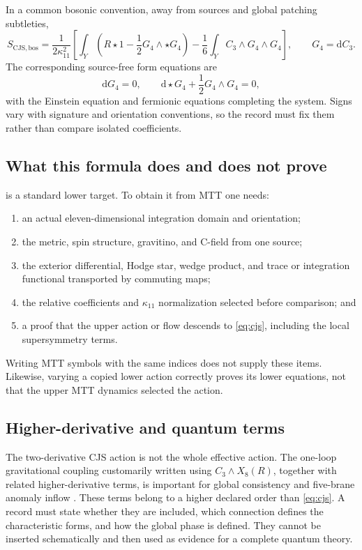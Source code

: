 \documentclass[11pt]{article}
\theoremstyle{definition}
\theoremstyle{remark}
\newcommand{\dd}{\mathrm d}
\begin{document}
In a common bosonic convention, away from sources and global patching
subtleties,
\begin{equation}
S_{\mathrm{CJS,bos}}
=\frac{1}{2\kappa_{11}^{2}}
\left[
\int_Y\left(R\star 1-\frac12 G_4\wedge\star G_4\right)
-\frac16\int_Y C_3\wedge G_4\wedge G_4
\right],
\qquad
G_4=\dd C_3 .
\label{eq:cjs}
\end{equation}
The corresponding source-free form equations are
\begin{equation}
\dd G_4=0,
\qquad
\dd\star G_4+\frac12 G_4\wedge G_4=0,
\label{eq:form-eom}
\end{equation}
with the Einstein equation and fermionic equations completing the system.
Signs vary with signature and orientation conventions, so the record must
fix them rather than compare isolated coefficients.

\subsection{What this formula does and does not prove}

 is a standard lower target.  To obtain it from MTT one needs:
\begin{enumerate}[leftmargin=1.7em]
\item an actual eleven-dimensional integration domain and orientation;
\item the metric, spin structure, gravitino, and C-field from one source;
\item the exterior differential, Hodge star, wedge product, and trace or
      integration functional transported by commuting maps;
\item the relative coefficients and \(\kappa_{11}\) normalization selected
      before comparison; and
\item a proof that the upper action or flow descends to
      \cref{eq:cjs}, including the local supersymmetry terms.
\end{enumerate}

Writing MTT symbols with the same indices does not supply these items.
Likewise, varying a copied lower action correctly proves its lower equations,
not that the upper MTT dynamics selected the action.

\subsection{Higher-derivative and quantum terms}

The two-derivative CJS action is not the whole effective action.  The
one-loop gravitational coupling customarily written using
\(C_3\wedge X_8(R)\), together with related higher-derivative terms, is
important for global consistency and five-brane anomaly inflow
\cite{Witten1997,FHMM1998}.  These terms belong to a higher declared order
than \cref{eq:cjs}.  A record must state whether they are included, which
connection defines the characteristic forms, and how the global phase is
defined.  They cannot be inserted schematically and then used as evidence
for a complete quantum theory.
\end{document}
